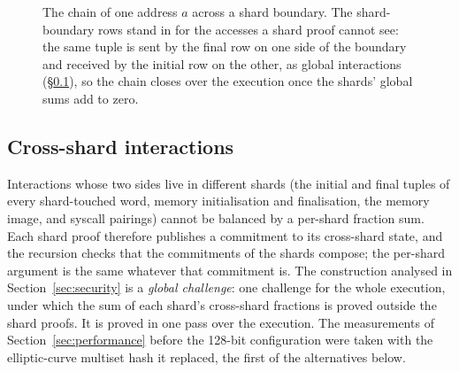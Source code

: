\begin{figure}[!tbp]
\centering
\resizebox{\textwidth}{!}{}
\caption{The chain of one address $a$ across a shard boundary. The shard-boundary rows stand in for the accesses a shard proof cannot see: the same tuple is sent by the final row on one side of the boundary and received by the initial row on the other, as global interactions (\S\ref{sec:air-global}), so the chain closes over the execution once the shards' global sums add to zero.}
\label{fig:memchain}
\end{figure}

\subsection{Cross-shard interactions}
\label{sec:air-global}

Interactions whose two sides live in different shards (the initial and final tuples of every shard-touched word, memory initialisation and finalisation, the memory image, and syscall pairings) cannot be balanced by a per-shard fraction sum. Each shard proof therefore publishes a commitment to its cross-shard state, and the recursion checks that the commitments of the shards compose; the per-shard argument is the same whatever that commitment is. The construction analysed in Section~\ref{sec:security} is a \emph{global challenge}: one \LogUp{} challenge for the whole execution, under which the sum of each shard's cross-shard fractions is proved outside the shard proofs. It is proved in one pass over the execution. The measurements of Section~\ref{sec:performance} before the 128-bit configuration were taken with the elliptic-curve multiset hash it replaced, the first of the alternatives below.

